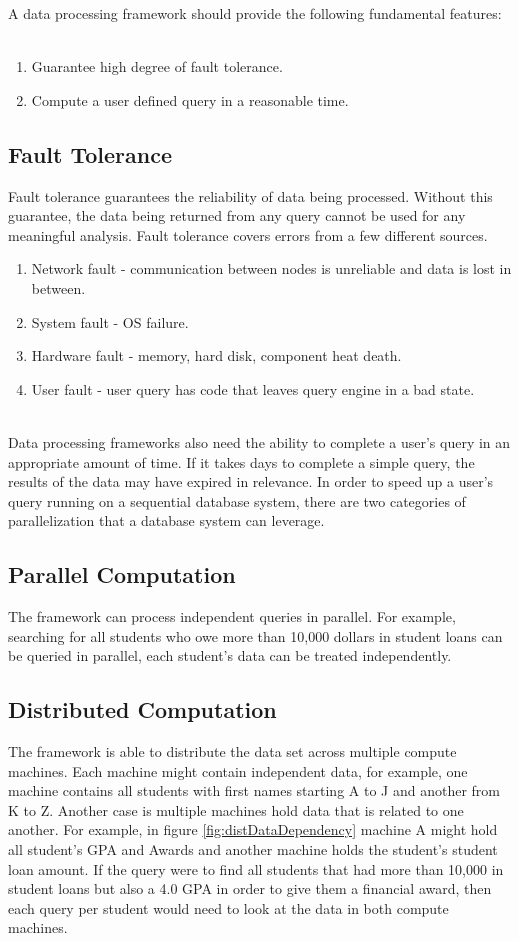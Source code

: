 \documentclass[10pt,twocolumn]{IEEEtran11}
\begin{document}
A data processing framework should provide the following fundamental features:
\ \\
\begin{enumerate}	
\setlength\itemsep{1em}
	\item Guarantee high degree of fault tolerance.
	\item Compute a user defined query in a reasonable time.
\end{enumerate}

\subsection{Fault Tolerance}
Fault tolerance guarantees the reliability of data being processed.  Without this guarantee, the data being returned from any query cannot be used for any meaningful analysis.   Fault tolerance covers errors from a few different sources.
\  \\
\begin{enumerate}
	\setlength\itemsep{1em}
	\item Network fault - communication between nodes is unreliable and data is lost in between.
	\item System fault - OS failure.
	\item Hardware fault - memory, hard disk, component heat death.
	\item User fault - user query has code that leaves query engine in a bad state.
\end{enumerate}
\  \\
Data processing frameworks also need the ability to complete a user's query in an appropriate amount of time.  If it takes days to complete a simple query, the results of the data may have expired in relevance.
In order to speed up a user's query running on a sequential database system, there are two categories of parallelization that a database system can leverage.

\subsection{Parallel Computation}
The framework can process independent queries in parallel.  For example, searching for all students who owe more than 10,000 dollars in student loans
can be queried in parallel, each student's data can be treated independently.

\subsection{Distributed Computation}
The framework is able to distribute the data set across multiple compute machines.  Each machine might contain independent data, for example, one machine contains all students with first names starting A to J and another from K to Z.  Another case is multiple machines hold data that is related to one another.  For example, in figure \ref{fig:distDataDependency} machine A might hold all student's GPA and Awards and another machine holds the student's student loan amount.
If the query were to find all students that had more than 10,000 in student loans but also a 4.0 GPA in order to give them a financial award, then each query per student would need to look at the data in both compute machines.
\end{document}
